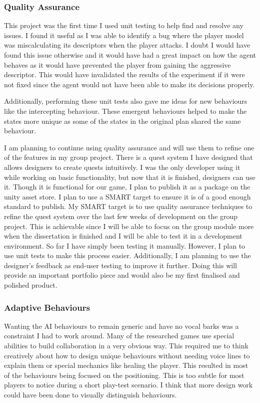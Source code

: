 \documentclass{IEEEtran}
\begin{document}
\subsubsection{Quality Assurance}

This project was the first time I used unit testing to help find and resolve any issues. I found it useful as I was able to identify a bug where the player model was miscalculating its descriptors when the player attacks. I doubt I would have found this issue otherwise and it would have had a great impact on how the agent behaves as it would have prevented the player from gaining the aggressive descriptor. This would have invalidated the results of the experiment if it were not fixed since the agent would not have been able to make its decisions properly.

Additionally, performing these unit tests also gave me ideas for new behaviours like the intercepting behaviour. These emergent behaviours helped to make the states more unique as some of the states in the original plan shared the same behaviour.

I am planning to continue using quality assurance and will use them to refine one of the features in my group project. There is a quest system I have designed that allows designers to create quests intuitively. I was the only developer using it while working on basic functionality, but now that it is finished, designers can use it. Though it is functional for our game, I plan to publish it as a package on the unity asset store. I plan to use a SMART target to ensure it is of a good enough standard to publish. My SMART target is to use quality assurance techniques to refine the quest system over the last few weeks of development on the group project. This is achievable since I will be able to focus on the group module more when the dissertation is finished and I will be able to test it in a development environment. So far I have simply been testing it manually. However, I plan to use unit tests to make this process easier. Additionally, I am planning to use the designer’s feedback as end-user testing to improve it further. Doing this will provide an important portfolio piece and would also be my first finalised and polished product.

\subsubsection{Adaptive Behaviours}

Wanting the AI behaviours to remain generic and have no vocal barks was a constraint I had to work around. Many of the researched games use special abilities to build collaboration in a very obvious way. This required me to think creatively about how to design unique behaviours without needing voice lines to explain them or special mechanics like healing the player. This resulted in most of the behaviours being focused on the positioning. This is too subtle for most players to notice during a short play-test scenario. I think that more design work could have been done to visually distinguish behaviours.
\end{document}
